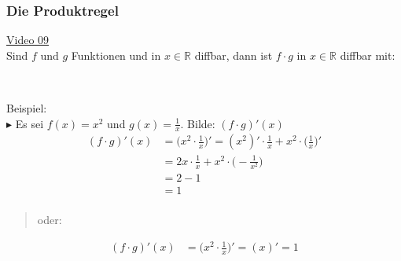 \subsubsection{Die Produktregel}
\href{https://youtu.be/F_hkOScmyQQ}{Video 09}\\
Sind $ f $ und $ g $ Funktionen und in $ x\in\mathbb{R} $ diffbar, dann ist $ f\cdot g $ in $ x\in\mathbb{R} $ diffbar mit:\\
\begin{center}
	\\	
\end{center}
Beispiel:\\
$\blacktriangleright$ Es sei $ f(x)=x^2$ und $ g(x)=\frac{1}{x} $. Bilde: $ (f\cdot g)'(x) $\\
\begin{align*}
(f\cdot g)'(x)&=\bigg(x^2\cdot \frac{1}{x}\bigg)'=(x^2)'\cdot \frac{1}{x}+x^2\cdot\bigg(\frac{1}{x}\bigg)'\\
&=2x\cdot \frac{1}{x}+x^2\cdot \bigg(-\frac{1}{x^2}\bigg)\\
&=2-1\\
&=1\\
\end{align*}
\begin{quote}
	oder:\\
\end{quote}
\begin{align*}
(f\cdot g)'(x)&=\bigg(x^2\cdot \frac{1}{x}\bigg)'=(x)'=1\\
\end{align*}
